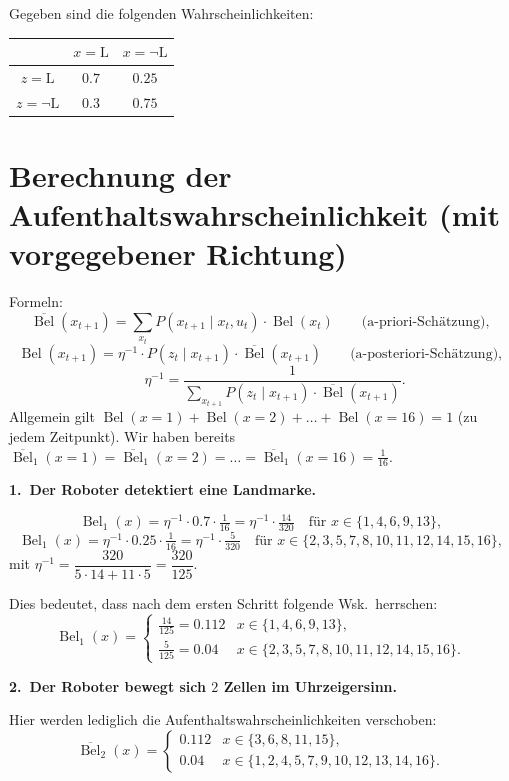 \documentclass[11pt,a4paper]{article}
\newcommand{\Bel}{\operatorname{Bel}}
\newcommand{\pBel}{\overline{\operatorname{Bel}}}
\newcommand{\LM}{\mathrm{L}}
\begin{document}
Gegeben sind die folgenden Wahrscheinlichkeiten:

\begin{center}
\setlength{\tabcolsep}{10pt}
\begin{tabular}{c|cc}
\toprule
 & $x=\LM$ & $x=\neg\LM$ \\
\midrule
$z=\LM$       & $0.7$ & $0.25$ \\
$z=\neg\LM$   & $0.3$ & $0.75$ \\
\bottomrule
\end{tabular}
\end{center}

\section*{Berechnung der Aufenthaltswahrscheinlichkeit (mit vorgegebener Richtung)}

Formeln:
\[
  \pBel(x_{t+1}) = \sum_{x_t} P(x_{t+1}\mid x_t,u_t)\cdot \Bel(x_t)
  \qquad\text{(a-priori-Schätzung)},
\]
\[
  \Bel(x_{t+1}) = \eta^{-1}\cdot P(z_t\mid x_{t+1})\cdot \pBel(x_{t+1})
  \qquad\text{(a-posteriori-Schätzung)},
\]
\[
  \qquad
  \eta^{-1} = \frac{1}{\sum_{x_{t+1}} P(z_t\mid x_{t+1})\cdot \pBel(x_{t+1})}.
\]
Allgemein gilt $\Bel(x=1)+\Bel(x=2)+\dots+\Bel(x=16)=1$ (zu jedem Zeitpunkt).
Wir haben bereits $\pBel_1(x=1)=\pBel_1(x=2)=\dots=\pBel_1(x=16)=\tfrac{1}{16}$.

\textbf{1.\ Der Roboter detektiert eine Landmarke.}

\[
  \Bel_1(x) = \eta^{-1}\cdot 0.7\cdot\tfrac{1}{16} = \eta^{-1}\cdot\tfrac{14}{320}
  \quad\text{für } x\in\{1,4,6,9,13\},
\]
\[
  \Bel_1(x) = \eta^{-1}\cdot 0.25\cdot\tfrac{1}{16} = \eta^{-1}\cdot\tfrac{5}{320}
  \quad\text{für } x\in\{2,3,5,7,8,10,11,12,14,15,16\},
\]
mit $\eta^{-1} = \dfrac{320}{5\cdot 14 + 11\cdot 5} = \dfrac{320}{125}$.

Dies bedeutet, dass nach dem ersten Schritt folgende Wsk.\ herrschen:
\[
  \Bel_1(x) =
  \begin{cases}
    \tfrac{14}{125}=0.112 & x\in\{1,4,6,9,13\},\\[0.3em]
    \tfrac{5}{125}=0.04   & x\in\{2,3,5,7,8,10,11,12,14,15,16\}.
  \end{cases}
\]

\textbf{2.\ Der Roboter bewegt sich $2$ Zellen im Uhrzeigersinn.}

Hier werden lediglich die Aufenthaltswahrscheinlichkeiten verschoben:
\[
  \pBel_2(x) =
  \begin{cases}
    0.112 & x\in\{3,6,8,11,15\},\\
    0.04  & x\in\{1,2,4,5,7,9,10,12,13,14,16\}.
  \end{cases}
\]
\end{document}
